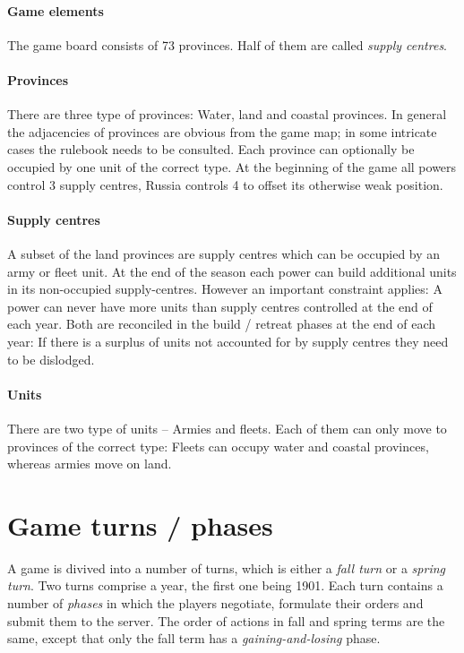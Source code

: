 \documentclass[pdftex,11pt,a4paper]{report}
\begin{document}
\paragraph{Game elements}

The game board consists of 73 provinces. Half of them are 
called \textit{supply centres}.

\paragraph{Provinces}

There are three type of provinces: Water, land and coastal 
provinces. In general the adjacencies of provinces are obvious
from the game map; in some intricate cases the rulebook needs to
be consulted. Each province can optionally be occupied by one
unit of the correct type. At the beginning of the game all powers
control 3 supply centres, Russia controls 4 to offset its
otherwise weak position.

\paragraph{Supply centres}

A subset of the land provinces are supply centres which can be 
occupied by an army or fleet unit. At the end of the season each power
can build additional units in its non-occupied supply-centres.
However an important constraint applies: A power 
can never have more units than supply centres controlled at the end
of each year. Both are reconciled in the build / retreat phases
at the end of each year: If there is a surplus of units not accounted
for by supply centres they need to be dislodged.

\paragraph{Units}

There are two type of units -- Armies and fleets.
Each of them can only move to provinces of the correct type:
Fleets can occupy water and coastal provinces, whereas armies 
move on land.

\section{Game turns / phases}

A game is divived into a number of turns, which is either a
\textit{fall turn} or a \textit{spring turn}. Two turns comprise
a year, the first one being 1901. Each turn contains a number of 
\textit{phases} in which the players negotiate, formulate
their orders and submit them to the server. The order of actions in
fall and spring terms are the same, except that only the fall term
has a \textit{gaining-and-losing} phase.
\end{document}
